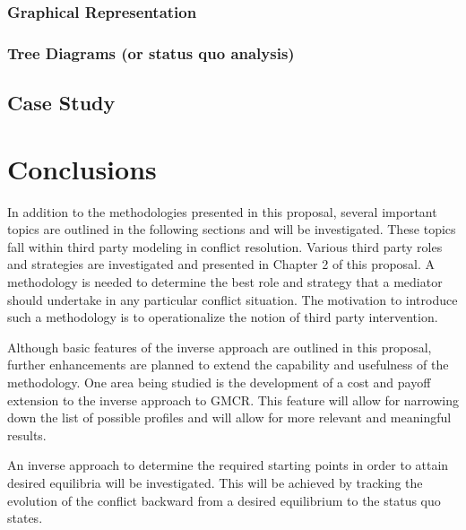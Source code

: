 \documentclass[letterpaper,12pt,titlepage,oneside,final]{book}
\begin{document}
\subsection{Graphical Representation}
\subsection{Tree Diagrams (or status quo analysis)}

\section{Case Study}




\chapter{Conclusions}
In addition to the methodologies presented in this proposal, several important topics are outlined in the following sections and will be investigated. These topics fall within third party modeling in conflict resolution.
Various third party roles and strategies are investigated and presented in Chapter 2 of this proposal. A methodology is needed to determine the best role and strategy that a mediator should undertake in any particular conflict situation. The motivation to introduce such a methodology is to operationalize the notion of third party intervention.

Although basic features of the inverse approach are outlined in this proposal, further enhancements are planned to extend the capability and usefulness of the methodology. One area being studied is the development of a cost and payoff extension to the inverse approach to GMCR. This feature will allow for narrowing down the list of possible profiles and will allow for more relevant and meaningful results.

An inverse approach to determine the required starting points in order to attain desired equilibria will be investigated. This will be achieved by tracking the evolution of the conflict backward from a desired equilibrium to the status quo states.
\end{document}
